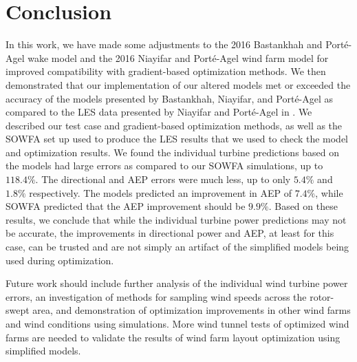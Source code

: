 \documentclass[conf]{new-aiaa}
\begin{document}
\section{Conclusion}
In this work, we have made some adjustments to the 2016 Bastankhah and Port\'{e}-Agel wake model and the 2016 Niayifar and Port\'{e}-Agel wind farm model for improved compatibility with gradient-based optimization methods. We then demonstrated that our implementation of our altered models met or exceeded the accuracy of the models presented by Bastankhah, Niayifar, and Port\'{e}-Agel as compared to the LES data presented by Niayifar and Port\'{e}-Agel in \cite{niayifar2016}. We described our test case and gradient-based optimization methods, as well as the SOWFA set up used to produce the LES results that we used to check the model and optimization results. We found the individual turbine predictions based on the models had large errors as compared to our SOWFA simulations, up to $118.4\%$. The directional and AEP errors were much less, up to only $5.4\%$ and $1.8\%$ respectively. The models predicted an improvement in AEP of $7.4\%$, while SOWFA predicted that the AEP improvement should be $9.9\%$. Based on these results, we conclude that while the individual turbine power predictions may not be accurate, the improvements in directional power and AEP, at least for this case, can be trusted and are not simply an artifact of the simplified models being used during optimization.

Future work should include further analysis of the individual wind turbine power errors, an investigation of methods for sampling wind speeds across the rotor-swept area, and demonstration of optimization improvements in other wind farms and wind conditions using simulations. More wind tunnel tests of optimized wind farms are needed to validate the results of wind farm layout optimization using simplified models.



\end{document}
